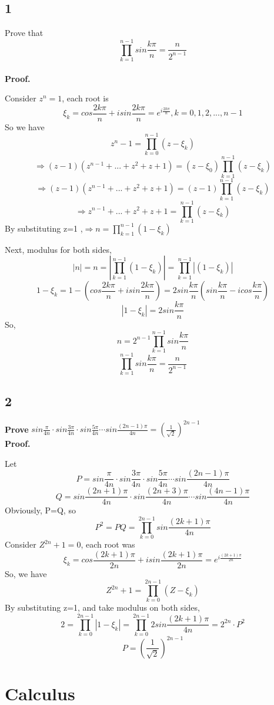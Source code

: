 \documentclass[11pt,a4paper]{article}
\begin{document}
\subsection{1}
Prove that $$\prod_{k=1}^{n-1}sin\frac{k\pi}{n} = \frac{n}{2^{n-1}} $$
\\\textbf{Proof.}

Consider $z^n=1$, each root is 
$$\xi_k = cos\frac{2k\pi}{n} + isin\frac{2k\pi}{n} = e^{i\frac{2k\pi}{n}}, k=0,1,2,...,n-1 $$
So we have
$$ z^n -1 = \prod_{k=0}^{n-1}(z-\xi_k)$$
$$\Longrightarrow (z-1)(z^{n-1}+...+z^2+z+1) = (z-\xi_0)\prod_{k=1}^{n-1}(z-\xi_k)$$
$$\Longrightarrow (z-1)(z^{n-1}+...+z^2+z+1) = (z-1)\prod_{k=1}^{n-1}(z-\xi_k)$$
$$\Longrightarrow z^{n-1}+...+z^2+z+1 = \prod_{k=1}^{n-1}(z-\xi_k)$$
By substituting  z=1 ,$\Longrightarrow n = \prod_{k=1}^{n-1}(1-\xi_k) $

Next, modulus for both sides,
$$ |n| = n = |\prod_{k=1}^{n-1}(1-\xi_k)| = \prod_{k=1}^{n-1}|(1-\xi_k)|$$
$$ 1 - \xi_k = 1-(cos\frac{2k\pi}{n} + isin\frac{2k\pi}{n}) = 2sin\frac{k\pi}{n}(sin\frac{k\pi}{n} -icos\frac{k\pi}{n})$$
$$ |1 - \xi_k| = 2sin\frac{k\pi}{n} $$
So, 
$$ n = 2^{n-1}\prod_{k=1}^{n-1}sin\frac{k\pi}{n}$$
$$\prod_{k=1}^{n-1}sin\frac{k\pi}{n} = \frac{n}{2^{n-1}} $$

\subsection{2}
\textbf{Prove } $sin\frac{\pi}{4n}\cdot sin\frac{3\pi}{4n}\cdot sin\frac{5\pi}{4n}\cdots sin\frac{(2n-1)\pi}{4n} = (\frac{1}{\sqrt{2}})^{2n-1}$ 
\\\textbf{Proof.}

Let 
$$P=sin\frac{\pi}{4n}\cdot sin\frac{3\pi}{4n}\cdot sin\frac{5\pi}{4n}\cdots sin\frac{(2n-1)\pi}{4n}$$
$$Q=sin\frac{(2n+1)\pi}{4n}\cdot sin\frac{(2n+3)\pi}{4n}\cdots sin\frac{(4n-1)\pi}{4n}$$
Obviously, P=Q, so
$$ P^2 = PQ = \prod_{k=0}^{2n-1}sin\frac{(2k+1)\pi}{4n}$$
Consider $Z^{2n} +1 = 0$, each root was 
$$ \xi_k = cos\frac{(2k+1)\pi}{2n} + isin\frac{(2k+1)\pi}{2n}= e^{i\frac{(2k+1)\pi}{2n}}$$
So, we have
$$ Z^{2n} + 1 = \prod_{k=0}^{2n-1}(Z-\xi_k) $$
By substituting z=1, and take modulus on both sides, 
$$ 2 = \prod_{k=0}^{2n-1}|1-\xi_k| = \prod_{k=0}^{2n-1}2sin\frac{(2k+1)\pi}{4n} = 2^{2n}\cdot P^2$$
$$P=(\frac{1}{\sqrt{2}})^{2n-1}$$

\section{Calculus}
\end{document}
